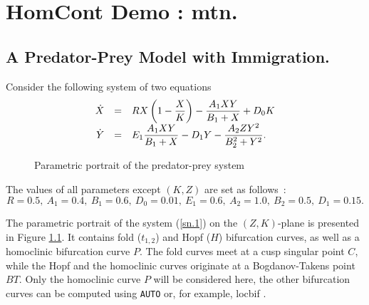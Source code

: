 \documentclass[12pt]{report}
\begin{document}
\chapter{ {\cal HomCont} Demo : mtn.} \label{ch:HomCont_mtn}

\section{ A Predator-Prey Model with Immigration.}
Consider the following system of two equations \cite{Sc:95}
\begin{equation} \label{sn.1} \begin{array}{rcl}
\dot{X} & = & RX\left(1-{\displaystyle \frac{X}{K}}\right) - 
{\displaystyle \frac{A_1XY}{B_1+X}} + D_0K \\
\dot{Y} & = & E_1 {\displaystyle \frac{A_1XY}{B_1+X}} - D_1Y - 
{\displaystyle\frac{A_2ZY^2}{B_2^2+Y^2}}.
\end{array} \end{equation}
\begin{figure}[b]
\epsfysize 10.0cm
\centerline{}
\caption{Parametric portrait of the predator-prey system }
\label{SNF.1}
\end{figure}
The values of all parameters except $(K,Z)$ are set as follows~:
$$
R=0.5,\ A_1=0.4,\ B_1=0.6,\ D_0=0.01,\ E_1=0.6,\ A_2=1.0,\ B_2=0.5,\ D_1=0.15.
$$
\par
\noindent
The parametric portrait of the system (\ref{sn.1}) on the
$(Z,K)$-plane is presented in Figure \ref{SNF.1}. It contains fold
($t_{1,2}$) and Hopf ($H$) bifurcation curves, as well as a homoclinic
bifurcation curve $P$. The fold curves meet at a cusp singular point
$C$, while the Hopf and the homoclinic curves originate at a
Bogdanov-Takens point $BT$. Only the homoclinic curve $P$ will be 
considered here, the other bifurcation curves can be computed using
{\tt AUTO} or,
for example, {\cal locbif} \cite{KhKuLeNi:93}.
\end{document}
